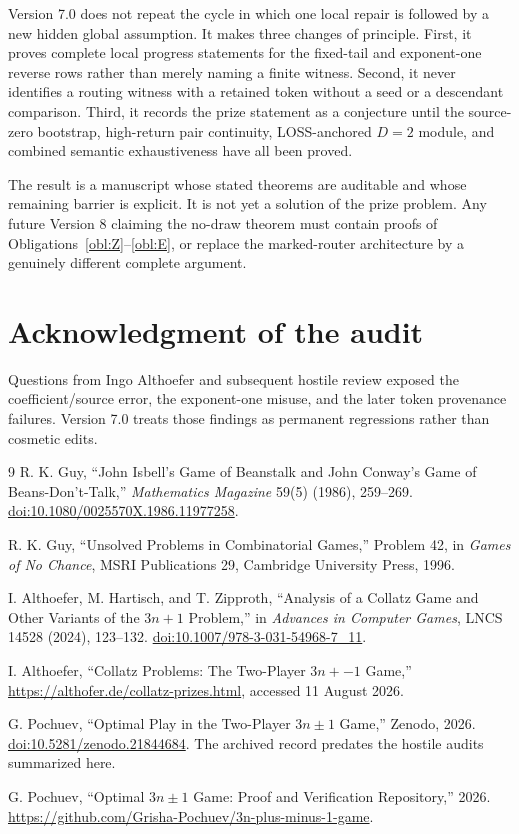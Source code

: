 Version 7.0 does not repeat the cycle in which one local repair is followed
by a new hidden global assumption.  It makes three changes of principle.
First, it proves complete local progress statements for the fixed-tail and
exponent-one reverse rows rather than merely naming a finite witness.
Second, it never identifies a routing witness with a retained token without
a seed or a descendant comparison.  Third, it records the prize statement
as a conjecture until the source-zero bootstrap, high-return pair continuity,
LOSS-anchored $D=2$ module, and combined semantic exhaustiveness have all
been proved.

The result is a manuscript whose stated theorems are auditable and whose
remaining barrier is explicit.  It is not yet a solution of the prize
problem.  Any future Version 8 claiming the no-draw theorem must contain
proofs of Obligations~\ref{obl:Z}--\ref{obl:E}, or replace the marked-router
architecture by a genuinely different complete argument.

\section*{Acknowledgment of the audit}
Questions from Ingo Althoefer and subsequent hostile review exposed the
coefficient/source error, the exponent-one misuse, and the later token
provenance failures.  Version 7.0 treats those findings as permanent
regressions rather than cosmetic edits.

\begingroup
\raggedright
\begin{thebibliography}{9}
R. K. Guy,
``John Isbell's Game of Beanstalk and John Conway's Game of Beans-Don't-Talk,''
\emph{Mathematics Magazine} 59(5) (1986), 259--269.
\href{https://doi.org/10.1080/0025570X.1986.11977258}{doi:10.1080/0025570X.1986.11977258}.

R. K. Guy,
``Unsolved Problems in Combinatorial Games,'' Problem 42,
in \emph{Games of No Chance}, MSRI Publications 29,
Cambridge University Press, 1996.

I. Althoefer, M. Hartisch, and T. Zipproth,
``Analysis of a Collatz Game and Other Variants of the $3n+1$ Problem,''
in \emph{Advances in Computer Games}, LNCS 14528 (2024), 123--132.
\href{https://doi.org/10.1007/978-3-031-54968-7_11}{doi:10.1007/978-3-031-54968-7\_11}.

I. Althoefer,
``Collatz Problems: The Two-Player $3n{+}{-}1$ Game,''
\url{https://althofer.de/collatz-prizes.html}, accessed 11 August 2026.

G. Pochuev,
``Optimal Play in the Two-Player $3n\pm1$ Game,''
Zenodo, 2026.
\href{https://doi.org/10.5281/zenodo.21844684}{doi:10.5281/zenodo.21844684}.
The archived record predates the hostile audits summarized here.

G. Pochuev,
``Optimal $3n\pm1$ Game: Proof and Verification Repository,'' 2026.
\url{https://github.com/Grisha-Pochuev/3n-plus-minus-1-game}.
\end{thebibliography}
\endgroup


